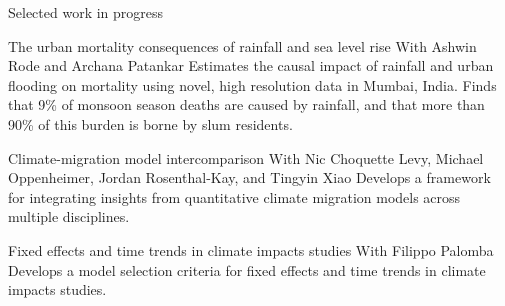 \documentclass{resume} %
\begin{document}

\begin{rSection}{Selected work in progress}
\begin{rSubsection}
{The urban mortality consequences of rainfall and sea level rise}
{}
{With Ashwin Rode and Archana Patankar}
{} {Estimates the causal impact of rainfall and urban flooding on mortality using novel, high resolution data in Mumbai, India. Finds that 9\% of monsoon season deaths are caused by rainfall, and that more than 90\% of this burden is borne by slum residents.}
\end{rSubsection}
\begin{rSubsection}
{Climate-migration model intercomparison}
{}
{With Nic Choquette Levy, Michael Oppenheimer, Jordan Rosenthal-Kay, and Tingyin Xiao}
{} {Develops a framework for integrating insights from quantitative climate migration models across multiple disciplines. }
\end{rSubsection}
\begin{rSubsection}
{Fixed effects and time trends in climate impacts studies}
{}
{With Filippo Palomba}
{} {Develops a model selection criteria for fixed effects and time trends in climate impacts studies.}
\end{rSubsection}
\end{rSection}
\end{document}
